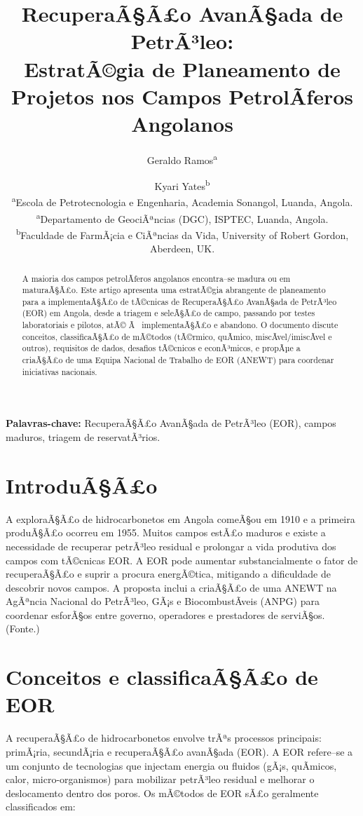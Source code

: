 \documentclass[11pt,a4paper]{article}
\title{RecuperaÃ§Ã£o AvanÃ§ada de PetrÃ³leo: \\ EstratÃ©gia de Planeamento de Projetos nos Campos PetrolÃ­feros Angolanos}
\author{Geraldo Ramos\textsuperscript{a} \and Kyari Yates\textsuperscript{b} \\
\small \textsuperscript{a}Escola de Petrotecnologia e Engenharia, Academia Sonangol, Luanda, Angola. \\
\small \textsuperscript{a}Departamento de GeociÃªncias (DGC), ISPTEC, Luanda, Angola. \\
\small \textsuperscript{b}Faculdade de FarmÃ¡cia e CiÃªncias da Vida, University of Robert Gordon, Aberdeen, UK.}
\date{}
\begin{document}
\maketitle


\begin{abstract}
A maioria dos campos petrolÃ­feros angolanos encontra--se madura ou em maturaÃ§Ã£o. 
Este artigo apresenta uma estratÃ©gia abrangente de planeamento para a implementaÃ§Ã£o de tÃ©cnicas de RecuperaÃ§Ã£o AvanÃ§ada de PetrÃ³leo (EOR) em Angola, desde a triagem e seleÃ§Ã£o de campo, passando por testes laboratoriais e pilotos, atÃ© Ã  implementaÃ§Ã£o e abandono. O documento discute conceitos, classificaÃ§Ã£o de mÃ©todos (tÃ©rmico, quÃ­mico, miscÃ­vel/imiscÃ­vel e outros), requisitos de dados, desafios tÃ©cnicos e econÃ³micos, e propÃµe a criaÃ§Ã£o de uma Equipa Nacional de Trabalho de EOR (ANEWT) para coordenar iniciativas nacionais. 
\end{abstract}

\noindent \textbf{Palavras-chave:} RecuperaÃ§Ã£o AvanÃ§ada de PetrÃ³leo (EOR), campos maduros, triagem de reservatÃ³rios.

\section{IntroduÃ§Ã£o}
A exploraÃ§Ã£o de hidrocarbonetos em Angola comeÃ§ou em 1910 e a primeira produÃ§Ã£o ocorreu em 1955. Muitos campos estÃ£o maduros e existe a necessidade de recuperar petrÃ³leo residual e prolongar a vida produtiva dos campos com tÃ©cnicas EOR. A EOR pode aumentar substancialmente o fator de recuperaÃ§Ã£o e suprir a procura energÃ©tica, mitigando a dificuldade de descobrir novos campos. A proposta inclui a criaÃ§Ã£o de uma ANEWT na AgÃªncia Nacional do PetrÃ³leo, GÃ¡s e BiocombustÃ­veis (ANPG) para coordenar esforÃ§os entre governo, operadores e prestadores de serviÃ§os. (Fonte.)

\section{Conceitos e classificaÃ§Ã£o de EOR}
A recuperaÃ§Ã£o de hidrocarbonetos envolve trÃªs processos principais: primÃ¡ria, secundÃ¡ria e recuperaÃ§Ã£o avanÃ§ada (EOR). A EOR refere--se a um conjunto de tecnologias que injectam energia ou fluidos (gÃ¡s, quÃ­micos, calor, micro-organismos) para mobilizar petrÃ³leo residual e melhorar o deslocamento dentro dos poros. Os mÃ©todos de EOR sÃ£o geralmente classificados em:
\end{document}
